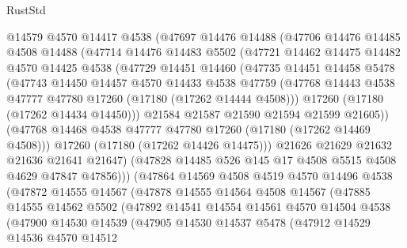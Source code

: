 \begin{lexlean}{RustStd}
\begin{coremodule}
{\begin{coremodule}
{{{{{{{{{{{{{{{{{{{{{{{{{{{{{{{{{{{{{{{{{{{{{{{{{{{{{{{          @14579
          @4570
          @14417
          @4538
          (@47697
            @14476
            @14488
            (@47706
              @14476
              @14485
              @4508
              @14488
              (@47714
                @14476
                @14483
                @5502
                (@47721
                  @14462
                  @14475
                  @14482
                  @4570
                  @14425
                  @4538
                  (@47729
                    @14451
                    @14460
                    (@47735
                      @14451
                      @14458
                      @5478
                      (@47743
                        @14450
                        @14457
                        @4570
                        @14433
                        @4538
                        @47759
                        (@47768 @14443 @4538 @47777 @47780 @17260 (@17180 (@17262 @14444 @4508)))
                        @17260
                        (@17180 (@17262 @14434 @14450)))
                      @21584
                      @21587
                      @21590
                      @21594
                      @21599
                      @21605))
                  (@47768 @14468 @4538 @47777 @47780 @17260 (@17180 (@17262 @14469 @4508)))
                  @17260
                  (@17180 (@17262 @14426 @14475)))
                @21626
                @21629
                @21632
                @21636
                @21641
                @21647)
              (@47828 @14485 @526 @145 @17 @4508 @5515 @4508 @4629 @47847 @47856)))
          (@47864
            @14569
            @4508
            @4519
            @4570
            @14496
            @4538
            (@47872
              @14555
              @14567
              (@47878
                @14555
                @14564
                @4508
                @14567
                (@47885
                  @14555
                  @14562
                  @5502
                  (@47892
                    @14541
                    @14554
                    @14561
                    @4570
                    @14504
                    @4538
                    (@47900
                      @14530
                      @14539
                      (@47905
                        @14530
                        @14537
                        @5478
                        (@47912
                          @14529
                          @14536
                          @4570
                          @14512
}}}}}}}}}}}}}}}}}}}}}}}}}}}}}}}}}}}}}}}}}}}}}}}}}}}}}}}
\end{coremodule}}
\end{coremodule}
\end{lexlean}
